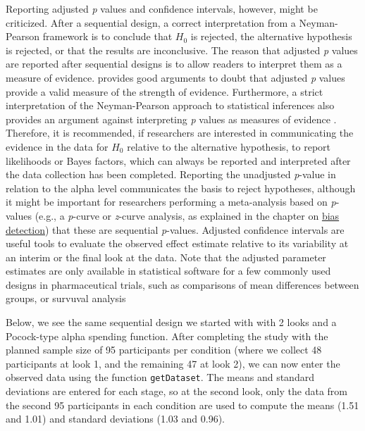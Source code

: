 \documentclass[
  oneside]{book}
\begin{document}
Reporting adjusted \emph{p} values and confidence intervals, however, might be criticized. After a sequential design, a correct interpretation from a Neyman-Pearson framework is to conclude that \(H_0\) is rejected, the alternative hypothesis is rejected, or that the results are inconclusive. The reason that adjusted \emph{p} values are reported after sequential designs is to allow readers to interpret them as a measure of evidence. \citet{dupont_sequential_1983} provides good arguments to doubt that adjusted \emph{p} values provide a valid measure of the strength of evidence. Furthermore, a strict interpretation of the Neyman-Pearson approach to statistical inferences also provides an argument against interpreting \emph{p} values as measures of evidence \citep{lakens_why_2022}. Therefore, it is recommended, if researchers are interested in communicating the evidence in the data for \(H_0\) relative to the alternative hypothesis, to report likelihoods or Bayes factors, which can always be reported and interpreted after the data collection has been completed. Reporting the unadjusted \emph{p}-value in relation to the alpha level communicates the basis to reject hypotheses, although it might be important for researchers performing a meta-analysis based on \emph{p}-values (e.g., a \emph{p}-curve or \emph{z}-curve analysis, as explained in the chapter on \protect\hyperlink{bias}{bias detection}) that these are sequential \emph{p}-values. Adjusted confidence intervals are useful tools to evaluate the observed effect estimate relative to its variability at an interim or the final look at the data. Note that the adjusted parameter estimates are only available in statistical software for a few commonly used designs in pharmaceutical trials, such as comparisons of mean differences between groups, or survuval analysis

Below, we see the same sequential design we started with with 2 looks and a Pocock-type alpha spending function. After completing the study with the planned sample size of 95 participants per condition (where we collect 48 participants at look 1, and the remaining 47 at look 2), we can now enter the observed data using the function \texttt{getDataset}. The means and standard deviations are entered for each stage, so at the second look, only the data from the second 95 participants in each condition are used to compute the means (1.51 and 1.01) and standard deviations (1.03 and 0.96).
\end{document}
